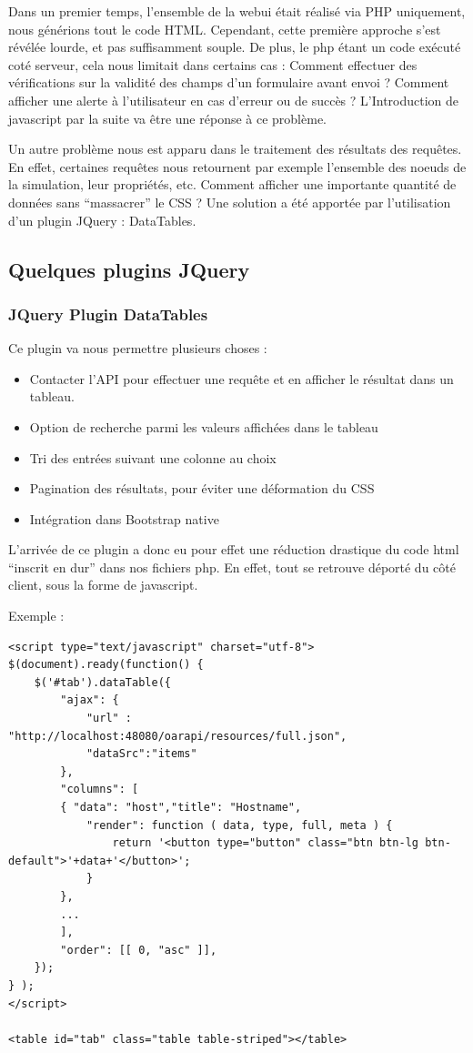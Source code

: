 \documentclass[a4paper,10pt]{article}
\begin{document}
Dans un premier temps, l'ensemble de la webui était réalisé via PHP uniquement, nous générions tout le code HTML. Cependant, cette première approche s'est révélée lourde, et pas suffisamment souple.
De plus, le php étant un code exécuté coté serveur, cela nous limitait dans certains cas : Comment effectuer des vérifications sur la validité des champs d'un formulaire avant envoi ? 
Comment afficher une alerte à l'utilisateur en cas d'erreur ou de succès ? L'Introduction de javascript par la suite va être une réponse à ce problème.
\vspace{0.5cm}

Un autre problème nous est apparu dans le traitement des résultats des requêtes. En effet, certaines requêtes nous retournent par exemple l'ensemble des noeuds de la simulation, leur propriétés, etc.
Comment afficher une importante quantité de données sans ``massacrer'' le CSS ? Une solution a été apportée par l'utilisation d'un plugin JQuery : DataTables.
\newpage
\subsection{Quelques plugins JQuery}
\subsubsection{JQuery Plugin DataTables}
Ce plugin va nous permettre plusieurs choses :
\begin{itemize}
 \item Contacter l'API pour effectuer une requête et en afficher le résultat dans un tableau.
 \item Option de recherche parmi les valeurs affichées dans le tableau
 \item Tri des entrées suivant une colonne au choix
 \item Pagination des résultats, pour éviter une déformation du CSS
 \item Intégration dans Bootstrap native
\end{itemize}

L'arrivée de ce plugin a donc eu pour effet une réduction drastique du code html ``inscrit en dur'' dans nos fichiers php.
En effet, tout se retrouve déporté du côté client, sous la forme de javascript.

Exemple :
\begin{lstlisting}
<script type="text/javascript" charset="utf-8">
$(document).ready(function() {
	$('#tab').dataTable({
		"ajax": {
			"url" : "http://localhost:48080/oarapi/resources/full.json",
			"dataSrc":"items"
		},
		"columns": [
		{ "data": "host","title": "Hostname",
			"render": function ( data, type, full, meta ) {
				return '<button type="button" class="btn btn-lg btn-default">'+data+'</button>';
		    }
		},
		...
		],
		"order": [[ 0, "asc" ]],
	});
} );
</script>

<table id="tab" class="table table-striped"></table>
\end{lstlisting}
\end{document}
